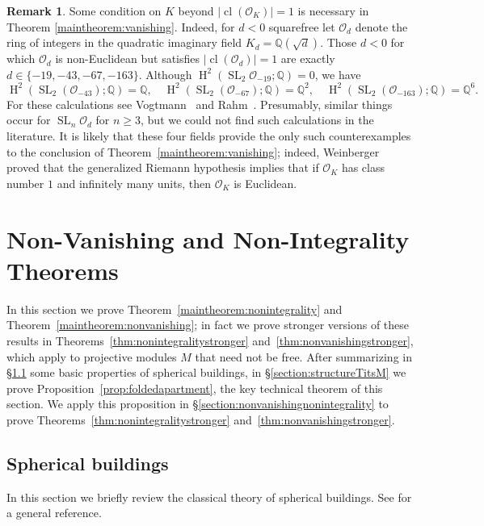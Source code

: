 \documentclass[11 pt]{article}
\theoremstyle{plain}
\theoremstyle{definition}
\newtheorem{remark}[theorem]{Remark}
\numberwithin{equation}{section}
\DeclareMathOperator{\SL}{SL}
\newcommand\Q{\ensuremath{\mathbb{Q}}}
\DeclareMathOperator{\HH}{H}
\renewcommand{\O}{\mathcal{O}}
\DeclareMathOperator{\class}{cl}
\newcommand\abs[1]{\left\lvert#1\right\rvert}
\begin{document}
\begin{remark}
\label{rem:thmCfalseimaginary}
Some condition on $K$ beyond $\abs{\class(\O_K)} = 1$ is necessary in Theorem
\ref{maintheorem:vanishing}.  Indeed, for $d<0$ squarefree let
$\O_d$ denote the ring of integers in the quadratic imaginary field $K_d=\Q(\sqrt{d})$.  Those $d < 0$ for which
$\O_d$ is non-Euclidean but satisfies $\abs{\class(\O_d)}=1$ are exactly
$d\in \{-19, -43, -67, -163\}$.  Although $\HH^2(\SL_2 \O_{-19};\Q) = 0$, we have
\[\HH^2(\SL_2 (\O_{-43});\Q) = \Q,\quad \HH^2(\SL_2 (\O_{-67});\Q) = \Q^2,\quad \HH^2(\SL_2 (\O_{-163});\Q) = \Q^6.\]
For these calculations see Vogtmann~\cite{VogtmannBianchi} and Rahm~\cite{RahmTorsion}.  Presumably,
similar things occur for $\SL_n \O_{d}$ for $n \geq 3$, but we could not find such calculations 
in the literature.  It is likely that these four fields provide the
only such counterexamples to the conclusion of Theorem~\ref{maintheorem:vanishing}; indeed, 
Weinberger~\cite{WeinbergerEuclidean}
proved that the generalized Riemann hypothesis implies that if $\O_K$ has class number $1$
and infinitely many units,
then $\O_K$ is Euclidean.
\end{remark}

\section{Non-Vanishing and Non-Integrality Theorems}
\label{section:prelimnonvanishing}

In this section we prove Theorem~\ref{maintheorem:nonintegrality} and Theorem~\ref{maintheorem:nonvanishing}; in fact we prove stronger versions of these results in Theorems~\ref{thm:nonintegralitystronger} and~\ref{thm:nonvanishingstronger}, which apply to projective modules $M$ that need not be free.  After summarizing in \S\ref{section:buildings} some basic properties of spherical buildings, in \S\ref{section:structureTitsM} we prove Proposition~\ref{prop:foldedapartment}, the key technical theorem 
of this section.  We apply this proposition in \S\ref{section:nonvanishingnonintegrality} to prove Theorems~\ref{thm:nonintegralitystronger} and~\ref{thm:nonvanishingstronger}.

\subsection{Spherical buildings}
\label{section:buildings}

In this section we briefly review the classical theory of spherical buildings.  See  \cite{BrownBuildings} for a general reference.
\end{document}
